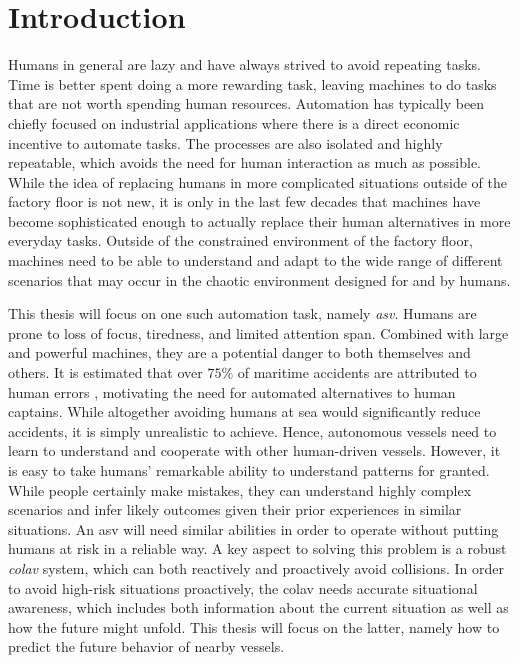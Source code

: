 \chapter{Introduction}
Humans in general are lazy and have always strived to avoid repeating tasks. Time is better spent doing a more rewarding task, leaving machines to do tasks that are not worth spending human resources. Automation has typically been chiefly focused on industrial applications where there is a direct economic incentive to automate tasks. The processes are also isolated and highly repeatable, which avoids the need for human interaction as much as possible. While the idea of replacing humans in more complicated situations outside of the factory floor is not new, it is only in the last few decades that machines have become sophisticated enough to actually replace their human alternatives in more everyday tasks. Outside of the constrained environment of the factory floor, machines need to be able to understand and adapt to the wide range of different scenarios that may occur in the chaotic environment designed for and by humans. 

This thesis will focus on one such automation task, namely \textit{\acrfull{asv}}. Humans are prone to loss of focus, tiredness, and limited attention span. Combined with large and powerful machines, they are a potential danger to both themselves and others. It is estimated that over $75\%$ of maritime accidents are attributed to human errors \cite{Tengesdal2020RiskbasedAM}, motivating the need for automated alternatives to human captains. While altogether avoiding humans at sea would significantly reduce accidents, it is simply unrealistic to achieve. Hence, autonomous vessels need to learn to understand and cooperate with other human-driven vessels. However, it is easy to take humans' remarkable ability to understand patterns for granted. While people certainly make mistakes, they can understand highly complex scenarios and infer likely outcomes given their prior experiences in similar situations. An \acrshort{asv} will need similar abilities in order to operate without putting humans at risk in a reliable way. A key aspect to solving this problem is a robust \textit{\acrfull{colav}} system, which can both reactively and proactively avoid collisions. In order to avoid high-risk situations proactively, the \acrshort{colav} needs accurate situational awareness, which includes both information about the current situation as well as how the future might unfold. This thesis will focus on the latter, namely how to predict the future behavior of nearby vessels.

